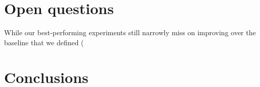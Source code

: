 \section{Open questions} %


While our best-performing experiments still narrowly miss on improving over the baseline that we defined (

\section{Conclusions}



